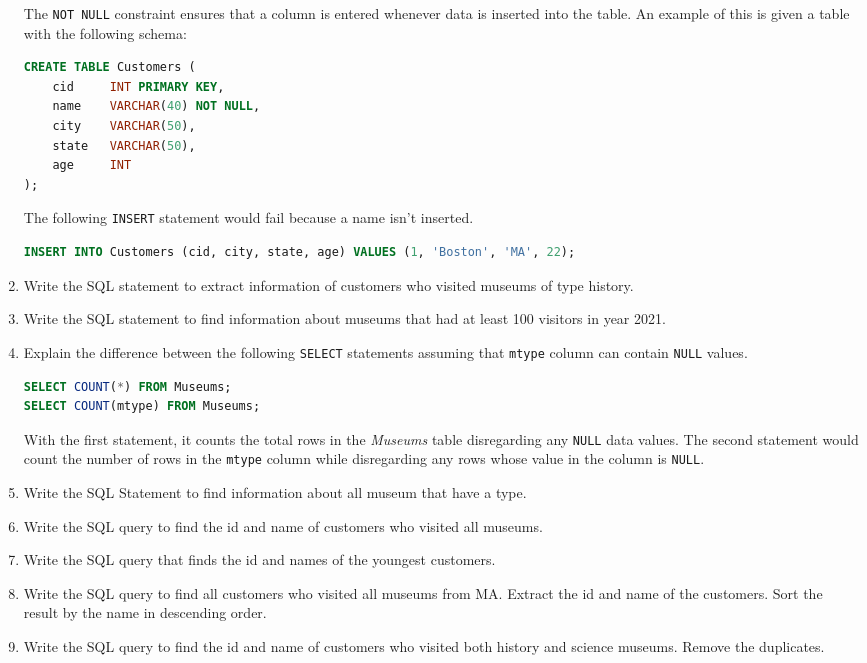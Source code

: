 \documentclass[letterpaper, 11pt]{article}
\begin{document}
\begin{enumerate}
    The \texttt{NOT NULL} constraint ensures that a column is entered whenever data is inserted into the table. An example of this is given a table with the following schema:
    \begin{tcolorbox}
    \begin{lstlisting}[language=SQL]
CREATE TABLE Customers (
    cid     INT PRIMARY KEY,
    name    VARCHAR(40) NOT NULL,
    city    VARCHAR(50),
    state   VARCHAR(50),
    age     INT
);
    \end{lstlisting}
    \end{tcolorbox}
    The following \texttt{INSERT} statement would fail because a name isn't inserted.
    \begin{tcolorbox}
    \begin{lstlisting}[language=SQL]
INSERT INTO Customers (cid, city, state, age) VALUES (1, 'Boston', 'MA', 22);
    \end{lstlisting}
    \end{tcolorbox}
    \item Write the SQL statement to extract information of customers who visited museums of type history.
    \item Write the SQL statement to find information about museums that had at least 100 visitors in year 2021.
    \item Explain the difference between the following \texttt{SELECT} statements assuming that \texttt{mtype} column can contain \texttt{NULL} values.
    \begin{tcolorbox}
    \begin{lstlisting}[language=SQL]
SELECT COUNT(*) FROM Museums;
SELECT COUNT(mtype) FROM Museums;
    \end{lstlisting}
    \end{tcolorbox}
    With the first statement, it counts the total rows in the \textit{Museums} table disregarding any \texttt{NULL} data values. The second statement would count the number of rows in the \texttt{mtype} column while disregarding any rows whose value in the column is \texttt{NULL}.
    \item Write the SQL Statement to find information about all museum that have a type.
    \item Write the SQL query to find the id and name of customers who visited all museums.
    \item Write the SQL query that finds the id and names of the youngest customers.
    \item Write the SQL query to find all customers who visited all museums from MA. Extract the id and name of the customers. Sort the result by the name in descending order.
    \item Write the SQL query to find the id and name of customers who visited both history and science museums. Remove the duplicates. 
\end{enumerate}
\end{document}
